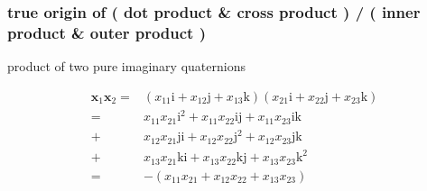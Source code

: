 \documentclass[
]{book}
\theoremstyle{definition}
\theoremstyle{definition}
\theoremstyle{definition}
\theoremstyle{definition}
\theoremstyle{remark}
\begin{document}
\subsubsection{true origin of ( dot product \& cross product ) / ( inner product \& outer product )}\label{true-origin-of-dot-product-cross-product-inner-product-outer-product}

product of two pure imaginary quaternions

\[
\begin{aligned}
\boldsymbol{x}_{{\scriptscriptstyle 1}}\boldsymbol{x}_{{\scriptscriptstyle 2}}= & \left(x_{{\scriptscriptstyle 1}{\scriptscriptstyle 1}}\mathrm{i}+x_{{\scriptscriptstyle 1}{\scriptscriptstyle 2}}\mathrm{j}+x_{{\scriptscriptstyle 1}{\scriptscriptstyle 3}}\mathrm{k}\right)\left(x_{{\scriptscriptstyle 2}{\scriptscriptstyle 1}}\mathrm{i}+x_{{\scriptscriptstyle 2}{\scriptscriptstyle 2}}\mathrm{j}+x_{{\scriptscriptstyle 2}{\scriptscriptstyle 3}}\mathrm{k}\right)\\
= & x_{{\scriptscriptstyle 1}{\scriptscriptstyle 1}}x_{{\scriptscriptstyle 2}{\scriptscriptstyle 1}}\mathrm{i}^{{\scriptscriptstyle 2}}+x_{{\scriptscriptstyle 1}{\scriptscriptstyle 1}}x_{{\scriptscriptstyle 2}{\scriptscriptstyle 2}}\mathrm{i}\mathrm{j}+x_{{\scriptscriptstyle 1}{\scriptscriptstyle 1}}x_{{\scriptscriptstyle 2}{\scriptscriptstyle 3}}\mathrm{i}\mathrm{k}\\
+ & x_{{\scriptscriptstyle 1}{\scriptscriptstyle 2}}x_{{\scriptscriptstyle 2}{\scriptscriptstyle 1}}\mathrm{j}\mathrm{i}+x_{{\scriptscriptstyle 1}{\scriptscriptstyle 2}}x_{{\scriptscriptstyle 2}{\scriptscriptstyle 2}}\mathrm{j}^{{\scriptscriptstyle 2}}+x_{{\scriptscriptstyle 1}{\scriptscriptstyle 2}}x_{{\scriptscriptstyle 2}{\scriptscriptstyle 3}}\mathrm{j}\mathrm{k}\\
+ & x_{{\scriptscriptstyle 1}{\scriptscriptstyle 3}}x_{{\scriptscriptstyle 2}{\scriptscriptstyle 1}}\mathrm{k}\mathrm{i}+x_{{\scriptscriptstyle 1}{\scriptscriptstyle 3}}x_{{\scriptscriptstyle 2}{\scriptscriptstyle 2}}\mathrm{k}\mathrm{j}+x_{{\scriptscriptstyle 1}{\scriptscriptstyle 3}}x_{{\scriptscriptstyle 2}{\scriptscriptstyle 3}}\mathrm{k}^{{\scriptscriptstyle 2}}\\
= & -\left(x_{{\scriptscriptstyle 1}{\scriptscriptstyle 1}}x_{{\scriptscriptstyle 2}{\scriptscriptstyle 1}}+x_{{\scriptscriptstyle 1}{\scriptscriptstyle 2}}x_{{\scriptscriptstyle 2}{\scriptscriptstyle 2}}+x_{{\scriptscriptstyle 1}{\scriptscriptstyle 3}}x_{{\scriptscriptstyle 2}{\scriptscriptstyle 3}}\right)\\

\end{aligned}\]
\end{document}
